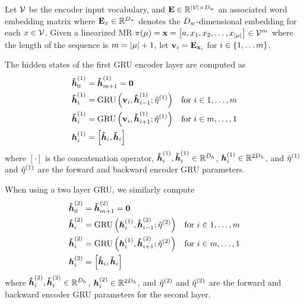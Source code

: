Let $\mathcal{V}$ be the encoder input vocabulary, and  $\mathbf{E} \in
\mathbb{R}^{{\lvert \mathcal{V} \rvert} \times {D_w}}$ an associated word embedding matrix
where $\mathbf{E}_{x} \in \mathbb{R}^{{D_w}}$ denotes the ${D_w}$-dimensional
embedding for each $x \in \mathcal{V}$. 
Given a linearized MR $\pi(\mu) = \mathbf{x}= \left[ a, x_1, x_2, \ldots,
x_{{\lvert \mu \rvert}}\right] \in \mathcal{V}^{m}$ where the length
of the sequence is $m = {\lvert \mu \rvert} + 1$,
let $\mathbf{v}_i = \mathbf{E}_{\mathbf{x}_i}$ for $i \in \{1, \ldots m\}$.




The hidden states of the first GRU encoder layer are
computed as
\begin{align*}
    \boldsymbol{\hat{h}}^{(1)}_0 & = \boldsymbol{\check{h}}^{(1)}_{m + 1} = \mathbf{0} \\
    \boldsymbol{\hat{h}}^{(1)}_i &= \operatorname{GRU}\left(\mathbf{v}_i, \boldsymbol{\hat{h}}^{(1)}_{i-1};
            \hat{\eta}^{(1)}\right) &
    \textrm{for $i \in 1,\ldots,m$}\\
    \boldsymbol{\check{h}}^{(1)}_i &= \operatorname{GRU}\left(\mathbf{v}_i, \boldsymbol{\check{h}}^{(1)}_{i+1};
            \check{\eta}^{(1)}\right) &
    \textrm{for $i \in m,\ldots,1$}\\
    \boldsymbol{h}_i^{(1)} & = \left[\boldsymbol{\hat{h}}_i, \boldsymbol{\check{h}}_i\right]
\end{align*}
where $\left[\cdot\right]$ is the concatenation operator, $\boldsymbol{\hat{h}}^{(1)}_i,\boldsymbol{\check{h}}^{(1)}_i \in \mathbb{R}^{{D_h}}$, $\boldsymbol{h}^{(1)}_i \in  \mathbb{R}^{2{D_h}}$,
and $\hat{\eta}^{(1)}$ and $\check{\eta}^{(1)}$ are the forward and backward
encoder GRU parameters.

When using a two layer GRU, we similarly compute
\begin{align*}
    \boldsymbol{\hat{h}}^{(2)}_0 & =\boldsymbol{\check{h}}^{(2)}_{m+1}  = \mathbf{0} \\
    \boldsymbol{\hat{h}}^{(2)}_i &= \operatorname{GRU}\left(\boldsymbol{h}^{(1)}_i, \boldsymbol{\hat{h}}^{(2)}_{i-1};
            \hat{\eta}^{(2)}\right) &
    \textrm{for $i \in 1,\ldots,m$}\\
    \boldsymbol{\check{h}}^{(2)}_i &= \operatorname{GRU}\left(\boldsymbol{h}^{(1)}_i, \boldsymbol{\check{h}}^{(2)}_{i+1};
            \check{\eta}^{(2)}\right) &
    \textrm{for $i \in m,\ldots,1$}\\
    \boldsymbol{h}_i^{(2)} & = \left[\boldsymbol{\hat{h}}_i, \boldsymbol{\check{h}}_i\right]
\end{align*}
where $\boldsymbol{\hat{h}}^{(2)}_i,\boldsymbol{\check{h}}^{(2)}_i \in \mathbb{R}^{{D_h}}$, $\boldsymbol{h}^{(2)}_i \in  \mathbb{R}^{2{D_h}}$,
and $\hat{\eta}^{(2)}$ and $\check{\eta}^{(2)}$ are the forward and backward
encoder GRU parameters for the second layer.

